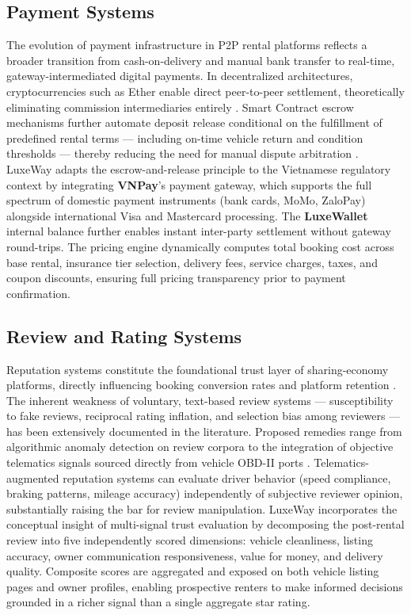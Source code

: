 \subsection{Payment Systems}

The evolution of payment infrastructure in P2P rental platforms reflects a broader transition from cash-on-delivery and manual bank transfer to real-time, gateway-intermediated digital payments. In decentralized architectures, cryptocurrencies such as Ether enable direct peer-to-peer settlement, theoretically eliminating commission intermediaries entirely \cite{elhog2025decentralized}. Smart Contract escrow mechanisms further automate deposit release conditional on the fulfillment of predefined rental terms --- including on-time vehicle return and condition thresholds --- thereby reducing the need for manual dispute arbitration \cite{madhusudan2019applying}. LuxeWay adapts the escrow-and-release principle to the Vietnamese regulatory context by integrating \textbf{VNPay}'s payment gateway, which supports the full spectrum of domestic payment instruments (bank cards, MoMo, ZaloPay) alongside international Visa and Mastercard processing. The \textbf{LuxeWallet} internal balance further enables instant inter-party settlement without gateway round-trips. The pricing engine dynamically computes total booking cost across base rental, insurance tier selection, delivery fees, service charges, taxes, and coupon discounts, ensuring full pricing transparency prior to payment confirmation.

\subsection{Review and Rating Systems}

Reputation systems constitute the foundational trust layer of sharing-economy platforms, directly influencing booking conversion rates and platform retention \cite{hu2019sharing}. The inherent weakness of voluntary, text-based review systems --- susceptibility to fake reviews, reciprocal rating inflation, and selection bias among reviewers --- has been extensively documented in the literature. Proposed remedies range from algorithmic anomaly detection on review corpora to the integration of objective telematics signals sourced directly from vehicle OBD-II ports \cite{neifer2024trust}. Telematics-augmented reputation systems can evaluate driver behavior (speed compliance, braking patterns, mileage accuracy) independently of subjective reviewer opinion, substantially raising the bar for review manipulation. LuxeWay incorporates the conceptual insight of multi-signal trust evaluation by decomposing the post-rental review into five independently scored dimensions: vehicle cleanliness, listing accuracy, owner communication responsiveness, value for money, and delivery quality. Composite scores are aggregated and exposed on both vehicle listing pages and owner profiles, enabling prospective renters to make informed decisions grounded in a richer signal than a single aggregate star rating.
